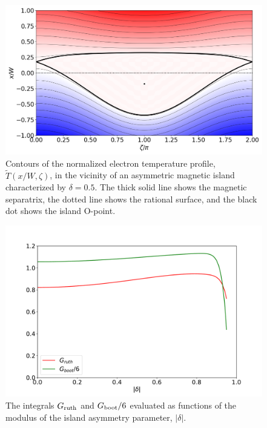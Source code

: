 \documentclass{iopjournal}
\begin{document}
{\begin{figure}
\centerline{\includegraphics[width=\textwidth]{Fig7.png}}
\caption{Contours of the normalized electron temperature profile, $\tilde{T}(x/W,\zeta)$, in the vicinity of an asymmetric magnetic island  characterized by
$\delta = 0.5$. The thick solid line shows the magnetic separatrix, the dotted line shows the rational surface, and the black dot shows the
island O-point.\label{fig5}}
\end{figure}

\begin{figure}
\centerline{\includegraphics[width=\textwidth]{Fig8.pdf}}
\caption{The integrals $G_{\rm ruth}$ and $G_{\rm boot}/6$ evaluated as functions of the modulus of the island asymmetry parameter, $|\delta|$.  \label{fig6}}
\end{figure}

}
\end{document}
